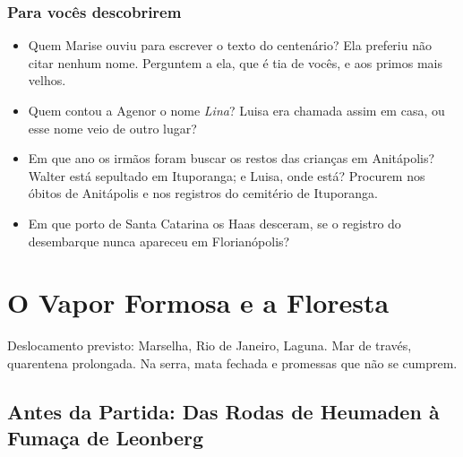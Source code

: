 \documentclass[
  brazilian,
  11pt,
  openany]{book}
\providecommand{\tightlist}{%
  \setlength{\itemsep}{0pt}\setlength{\parskip}{0pt}}
\newenvironment{boletim}{\begin{center}\begin{minipage}{0.85\linewidth}\small\itshape}{\end{minipage}\end{center}}
\begin{document}
\section{Para vocês descobrirem}\label{para-vocuxeas-descobrirem-2}

\begin{itemize}
\tightlist
\item
  Quem Marise ouviu para escrever o texto do centenário? Ela preferiu
  não citar nenhum nome. Perguntem a ela, que é tia de vocês, e aos
  primos mais velhos.
\item
  Quem contou a Agenor o nome \emph{Lina}? Luisa era chamada assim em
  casa, ou esse nome veio de outro lugar?
\item
  Em que ano os irmãos foram buscar os restos das crianças em
  Anitápolis? Walter está sepultado em Ituporanga; e Luisa, onde está?
  Procurem nos óbitos de Anitápolis e nos registros do cemitério de
  Ituporanga.
\item
  Em que porto de Santa Catarina os Haas desceram, se o registro do
  desembarque nunca apareceu em Florianópolis?
\end{itemize}

\part{O Vapor Formosa e a Floresta}\label{o-vapor-formosa-e-a-floresta}

\begin{boletim}

Deslocamento previsto: Marselha, Rio de Janeiro, Laguna. Mar de través,
quarentena prolongada. Na serra, mata fechada e promessas que não se
cumprem.

\end{boletim}

\chapter{Antes da Partida: Das Rodas de Heumaden à Fumaça de
Leonberg}\label{cap-4}
\end{document}
